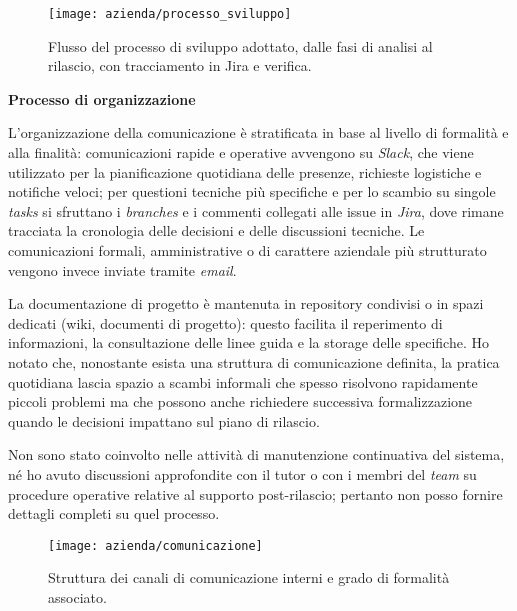\begin{figure}[htbp]
    \centering
    \texttt{[image: azienda/processo\_sviluppo]}
    \caption{Flusso del processo di sviluppo adottato, dalle fasi di analisi al rilascio, con tracciamento in Jira e verifica.}
    \label{fig:processo_sviluppo}
\end{figure}


\medskip
\noindent\textbf{Processo di organizzazione}

L’organizzazione della comunicazione è stratificata in base al livello di formalità e alla finalità: 
comunicazioni rapide e operative avvengono su \emph{Slack}, che viene utilizzato per la pianificazione quotidiana delle presenze, richieste logistiche e notifiche veloci; 
per questioni tecniche più specifiche e per lo scambio su singole \emph{tasks} si sfruttano i \emph{branches} e i commenti collegati alle issue in \emph{Jira}, 
dove rimane tracciata la cronologia delle decisioni e delle discussioni tecniche. Le comunicazioni formali, amministrative o di carattere aziendale più strutturato vengono invece inviate tramite \emph{email}.

La documentazione di progetto è mantenuta in repository condivisi o in spazi dedicati (wiki, documenti di progetto): 
questo facilita il reperimento di informazioni, la consultazione delle linee guida e la storage delle specifiche. 
Ho notato che, nonostante esista una struttura di comunicazione definita, la pratica quotidiana lascia spazio a scambi informali che spesso risolvono rapidamente piccoli 
problemi ma che possono anche richiedere successiva formalizzazione quando le decisioni impattano sul piano di rilascio.

Non sono stato coinvolto nelle attività di manutenzione continuativa del sistema, né ho avuto discussioni approfondite con il tutor o con i membri del \emph{team} su procedure 
operative relative al supporto post-rilascio; pertanto non posso fornire dettagli completi su quel processo.


\begin{figure}[htbp]
    \centering
    \texttt{[image: azienda/comunicazione]}
    \caption{Struttura dei canali di comunicazione interni e grado di formalità associato.}
    \label{fig:comunicazione}
\end{figure}



